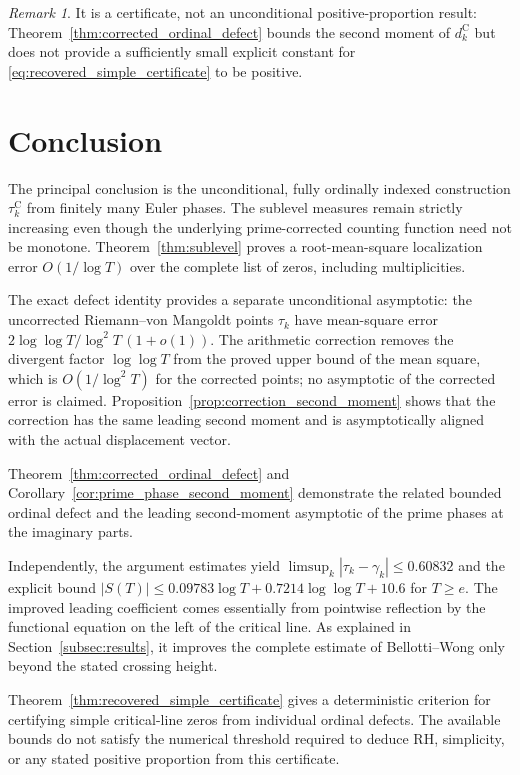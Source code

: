 \documentclass[11pt,a4paper]{article}
\makeatletter
\numberwithin{equation}{section}
\DeclareRobustCommand{\CGref}[1]{\ref{#1}}
\DeclareRobustCommand{\CGeqref}[1]{\eqref{#1}}
\let\CG@origref\ref
\let\CG@origeqref\eqref
\newcommand{\CG@gettip}[1]{\@ifundefined{CGTip@#1}{#1}{\csname CGTip@#1\endcsname}}
\DeclareRobustCommand{\CGref}[1]{\pdftooltip{\CG@origref{#1}}{\CG@gettip{#1}}}
\DeclareRobustCommand{\CGeqref}[1]{\pdftooltip{\CG@origeqref{#1}}{\CG@gettip{#1}}}
\theoremstyle{definition}
\theoremstyle{remark}
\newtheorem{remark}[theorem]{Remark}
\makeatother
\begin{document}
\begin{remark}\label{rem:certificate_scope}
It is a certificate, not an unconditional positive-proportion result:
Theorem~\CGref{thm:corrected_ordinal_defect} bounds the second moment
of $d_k^{\mathrm C}$ but does not provide a sufficiently small explicit
constant for \CGeqref{eq:recovered_simple_certificate} to be positive.
\end{remark}

\section{Conclusion}\label{sec:conclusion}
The principal conclusion is the unconditional, fully ordinally indexed
construction $\tau_k^{\mathrm C}$ from finitely many Euler phases.
The sublevel measures remain strictly increasing even though the
underlying prime-corrected counting function need not be monotone.
Theorem~\CGref{thm:sublevel} proves a root-mean-square localization error
$O(1/\log T)$ over the complete list of zeros, including multiplicities.

The exact defect identity provides a separate unconditional asymptotic:
the uncorrected Riemann--von Mangoldt points $\tau_k$ have mean-square error
$2\log\log T/\log^2T\,(1+o(1))$. The arithmetic correction removes the
divergent factor $\log\log T$ from the proved upper bound of the mean square,
which is $O(1/\log^2T)$ for the corrected points; no asymptotic of the corrected
error is claimed. Proposition~\CGref{prop:correction_second_moment} shows that
the correction has the same leading second moment and is asymptotically aligned with
the actual displacement vector.

Theorem~\CGref{thm:corrected_ordinal_defect}
and Corollary~\CGref{cor:prime_phase_second_moment} demonstrate the related
bounded ordinal defect and the leading second-moment asymptotic of the prime phases
at the imaginary parts.

Independently, the argument estimates yield
$\limsup_k|\tau_k-\gamma_k|\le0.60832$ and the explicit bound
$|S(T)|\le0.09783\log T+0.7214\log\log T+10.6$ for $T\ge e$.
The improved leading coefficient comes essentially from pointwise reflection by the
functional equation on the left of the critical line. As explained in
Section~\CGref{subsec:results}, it improves the complete estimate of
Bellotti--Wong only beyond the stated crossing height.

Theorem~\CGref{thm:recovered_simple_certificate} gives a deterministic criterion for certifying simple
critical-line zeros from individual ordinal defects. The available bounds
do not satisfy the numerical threshold required to deduce RH, simplicity,
or any stated positive proportion from this certificate.
\end{document}
